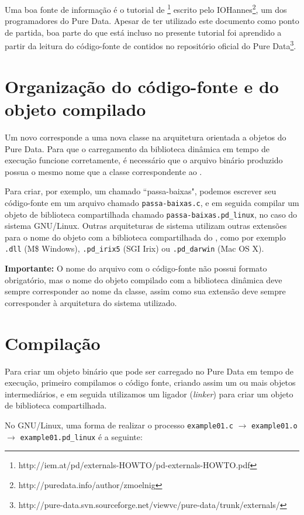 Uma boa fonte de informação é o tutorial de
\externals\footnote{http://iem.at/pd/externals-HOWTO/pd-externals-HOWTO.pdf}
escrito pelo IOHannes\footnote{http://puredata.info/author/zmoelnig}, um dos
programadores do Pure Data. Apesar de ter utilizado este documento como ponto
de partida, boa parte do que está incluso no presente tutorial foi aprendido a
partir da leitura do código-fonte de \externals contidos no repositório
oficial do Pure
Data\footnote{http://pure-data.svn.sourceforge.net/viewvc/pure-data/trunk/externals/}.

\section{Organização do código-fonte e do objeto compilado}

Um novo \external corresponde a uma nova classe na arquitetura orientada a
objetos do Pure Data. Para que o carregamento da biblioteca dinâmica
em tempo de execução funcione corretamente, é necessário que o
arquivo binário produzido possua o mesmo nome que a classe correspondente ao
\external.

Para criar, por exemplo, um \external chamado ``passa-baixas", podemos
escrever seu código-fonte em um arquivo chamado \texttt{passa-baixas.c}, e em
seguida compilar um objeto de biblioteca compartilhada chamado
\texttt{passa-baixas.pd\_linux}, no caso do sistema GNU/Linux. Outras
arquiteturas de sistema utilizam outras extensões para o nome do objeto com a
biblioteca compartilhada do \external, como por exemplo \texttt{.dll} (M\$
Windows), \texttt{.pd\_irix5} (SGI Irix) ou \texttt{.pd\_darwin} (Mac OS X).

\textbf{Importante:} O nome do arquivo com o código-fonte não possui formato
obrigatório, mas o nome do objeto compilado com a biblioteca dinâmica deve
sempre corresponder ao nome da classe, assim como sua extensão deve sempre
corresponder à arquitetura do sistema utilizado.

\section{Compilação}
\label{sec:compiling}

Para criar um objeto binário que pode ser carregado no Pure Data em tempo de
execução, primeiro compilamos o código fonte, criando assim um ou mais objetos
intermediários, e em seguida utilizamos um ligador (\emph{linker}) para criar
um objeto de biblioteca compartilhada.

No GNU/Linux, uma forma de realizar o processo
\texttt{example01.c} $\rightarrow$ \texttt{example01.o} $\rightarrow$
\texttt{example01.pd\_linux} é a seguinte:

